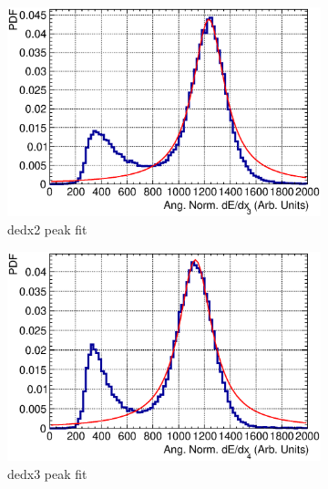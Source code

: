 \begin{figure}[t]
\begin{subfigure}{\dbfigwid\textwidth}
         \includegraphics[width=\textwidth]{figures/sel/fig54c.eps}
         \caption{dedx2 peak fit}
         \label{subfig:dedx2-peak}
    \end{subfigure}
    \begin{subfigure}{\dbfigwid\textwidth}
         \includegraphics[width=\textwidth]{figures/sel/fig54d.eps}
         \caption{dedx3 peak fit}
         \label{subfig:dedx3-peak}
    \end{subfigure}
    \\
    \begin{subfigure}{\dbfigwid\textwidth}

\end{subfigure}
\end{figure}
